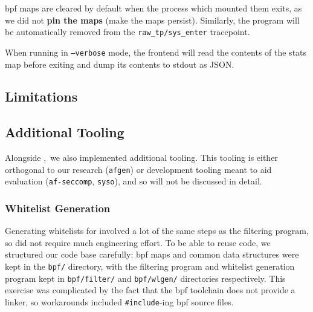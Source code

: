 \ac{bpf} maps are cleared by default when the process which mounted them exits,
as we did not \textbf{pin the maps} (make the maps persist). Similarly, the \af
program will be automatically removed from the \texttt{raw\_tp/sys\_enter}
tracepoint.

When running in \texttt{--verbose} mode, the frontend will read the contents of
the stats map before exiting and dump its contents to \ac{stdout} as JSON.

\subsection{Limitations}


\subsection{Additional Tooling}

Alongside \afss,~we also implemented additional tooling. This tooling is either
orthogonal to our research (\texttt{afgen}) or development tooling
meant to aid evaluation (\texttt{af-seccomp}, \texttt{syso}), and so will not be
discussed in detail. 

\subsubsection{Whitelist Generation}\label{subsubsec:impl-whitelist-gen}

Generating whitelists for \af involved a lot of the same steps as the filtering
program, so did not require much engineering effort. To be able to reuse code,
we structured our code base carefully: \ac{bpf} maps and common data structures
were kept in the \texttt{bpf/} directory, with the filtering program and
whitelist generation program kept in \texttt{bpf/filter/} and
\texttt{bpf/wlgen/} directories respectively. This exercise was complicated by
the fact that the \ac{bpf} toolchain does not provide a linker, so workarounds
included \texttt{\#include}-ing \ac{bpf} source files.

